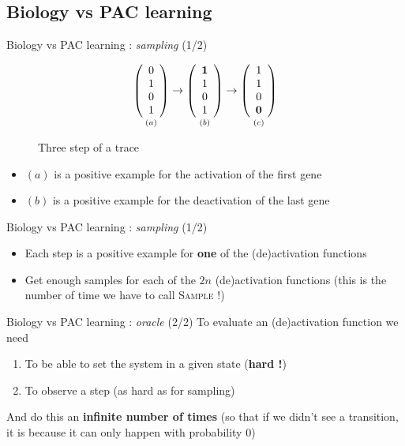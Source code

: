 \documentclass{beamer}
\begin{document}
\subsection{Biology vs PAC learning}
\begin{frame}{Biology vs PAC learning : \textit{sampling} (1/2)}
\begin{figure}
\[
\underset{\vspace{1em}(a)}{
\left(\begin{array}{c}
0\\ 1\\ 0\\ 1
\end{array}\right)}
\rightarrow
\underset{\vspace{1em}(b)}{
	\left(\begin{array}{c}
	\textbf{1}\\ 1\\ 0\\ 1
	\end{array}\right)}
\rightarrow
\underset{\vspace{1em}(c)}{
	\left(\begin{array}{c}
	1\\ 1\\ 0\\ \textbf{0}
	\end{array}\right)}
\]
\caption{Three step of a trace}
\end{figure}
\begin{itemize}
	\item $(a)$ is a positive example for the activation of the first gene
	\item $(b)$ is a positive example for the deactivation of the last gene
\end{itemize}
\end{frame}
\begin{frame}{Biology vs PAC learning : \textit{sampling} (1/2)}
\begin{itemize}
	\item Each step is a positive example for \textbf{one} of the (de)activation functions
	\item Get enough samples for each of the $2n$ (de)activation functions (this is the number of time we have to call \textsc{Sample} !)
\end{itemize}
\end{frame}
\begin{frame}{Biology vs PAC learning : \textit{oracle} (2/2)}
To evaluate an (de)activation function we need
\begin{enumerate}
	\item To be able to set the system in a given state (\textbf{hard !})
	\item To observe a step (as hard as for sampling)
\end{enumerate}
\pause
And do this an \textbf{infinite number of times} (so that if we didn't see a transition, it is because it can only happen with probability 0)
\end{frame}
\end{document}
